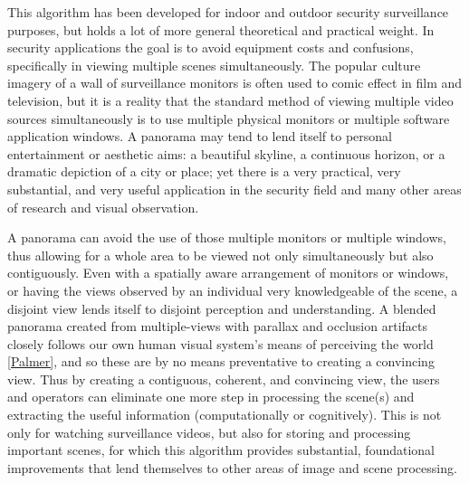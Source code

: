 %
%
%
%
%
%

%
%
%



This algorithm has been developed for indoor and outdoor security surveillance purposes, but holds a lot of more general theoretical and practical weight. In security applications the goal is to avoid equipment costs and confusions, specifically in viewing multiple scenes simultaneously. The popular culture imagery of a wall of surveillance monitors is often used to comic effect in film and television, but it is a reality that the standard method of viewing multiple video sources simultaneously is to use multiple physical monitors or multiple software application windows. A panorama may tend to lend itself to personal entertainment or aesthetic aims: a beautiful skyline, a continuous horizon, or a dramatic depiction of a city or place; yet there is a very practical, very substantial, and very useful application in the security field and many other areas of research and visual observation.

A panorama can avoid the use of those multiple monitors or multiple windows, thus allowing for a whole area to be viewed not only simultaneously but also contiguously. Even with a spatially aware arrangement of monitors or windows, or having the views observed by an individual very knowledgeable of the scene, a disjoint view lends itself to disjoint perception and understanding. A blended panorama created from multiple-views with parallax and occlusion artifacts closely follows our own human visual system's means of perceiving the world \ref{Palmer}, and so these are by no means preventative to creating a convincing view. Thus by creating a contiguous, coherent, and convincing view, the users and operators can eliminate one more step in processing the scene(s) and extracting the useful information (computationally or cognitively). This is not only for watching surveillance videos, but also for storing and processing important scenes, for which this algorithm provides substantial, foundational improvements that lend themselves to other areas of image and scene processing.

